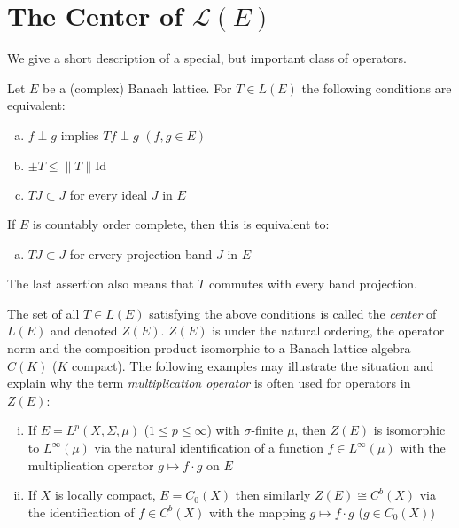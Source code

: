 \section{The Center of $\mathcal{L}(E)$}\label{sec:c1-9}

We give a short description of a special, but important class of operators.

Let $ E $ be a (complex) Banach lattice.
For $ T \in L(E) $ the following conditions are equivalent:

\begin{enumerate}[(a)]
\item $ f \perp g $ implies $ Tf \perp g $ \quad $(f, g \in E)$

\item $ \pm T \leq \|T\|\text{Id}$

\item $ TJ \subset J $ for every ideal $ J $ in $ E $
\end{enumerate}

If $ E $ is countably order complete, then this is equivalent to:

\begin{enumerate}[(d)]
\item $ TJ \subset J $ for ervery projection band $ J $ in $ E $
\end{enumerate}

The last assertion also means that $ T $ commutes with every band projection.

The set of all $ T \in L(E) $ satisfying the above conditions is called the \emph{center} of $ L(E) $ and denoted $ Z(E) $.
$ Z(E) $ is under the natural ordering, the operator norm and the composition product isomorphic to a Banach lattice algebra $ C(K) $ ($ K $ compact).
The following examples may illustrate the situation and explain why the term \emph{multiplication operator} is often used for operators in $ Z(E) $:

\begin{enumerate}[(i)]
\item If $ E = L^{p}(X,\Sigma,\mu) $ ($ 1 \leq p \leq \infty $) with $ \sigma $-finite $ \mu $, then $ Z(E) $ is isomorphic to $ L^{\infty}(\mu) $ via the natural identification of a function $ f \in L^{\infty}(\mu) $ with the multiplication operator $ g \mapsto f\cdot g $ on $ E $

\item If $ X $ is locally compact, $ E = C_{0}(X) $ then similarly $ Z(E) \cong C^{b}(X) $ via the identification of $ f \in C^{b}(X) $ with the mapping $ g \mapsto f\cdot g $ ($ g \in C_{0}(X) $)
\end{enumerate}




\pagebreak
